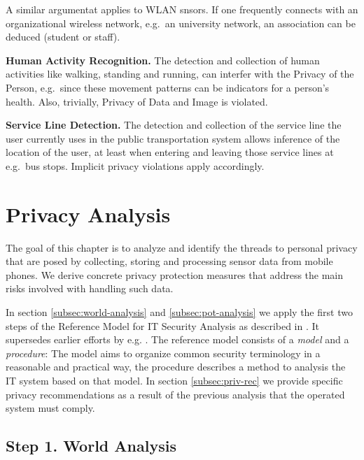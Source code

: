 \documentclass[runningheads,a4paper]{llncs}
\newenvironment{LGContent-Hidden}{ \comment  }{ }
\begin{document}
\begin{LGContent-Hidden}
A similar argumentat applies to WLAN snsors. If one frequently connects with an organizational wireless network, e.g.~an university network, an association can be deduced (student or staff).

\textbf{Human Activity Recognition.}
The detection and collection of human activities like walking, standing and running, can interfer with the Privacy of the Person, e.g.~since these movement patterns can be indicators for a person's health. Also, trivially, Privacy of Data and Image is violated.

\textbf{Service Line Detection.}
The detection and collection of the service line the user currently uses in the public transportation system allows inference of the location of the user, at least when entering and leaving those service lines at e.g.~bus stops.
Implicit privacy violations apply accordingly.

\end{LGContent-Hidden}









\section{Privacy Analysis}


The goal of this chapter is to analyze and identify the threads to
personal privacy that are posed by collecting, storing and processing
sensor data from mobile phones.  We derive concrete privacy protection
measures that address the main risks involved with handling such data.

In section \ref{subsec:world-analysis} and \ref{subsec:pot-analysis} we apply the first two steps of the Reference Model for IT Security Analysis as described in \cite{Grimm:ItSecRefModel}.  It supersedes earlier efforts by
e.g. \cite{Avizienis}.  The reference model consists of a \emph{model}
and a \emph{procedure}: The model aims to organize common security terminology in a reasonable and practical way, the procedure describes a method to analysis the IT system based on that model. In section \ref{subsec:priv-rec} we provide specific privacy recommendations as a result of the previous analysis that the operated system must comply.

\subsection{Step 1. World Analysis}
\end{document}
